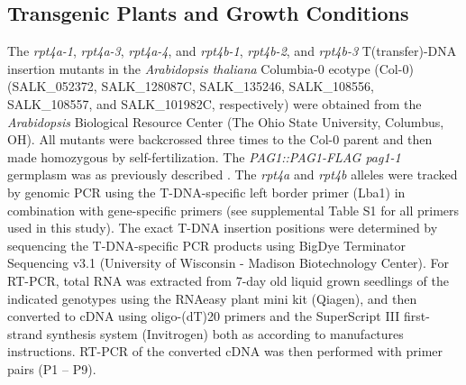 \subsection{Transgenic Plants and Growth Conditions}
The \textit{rpt4a-1},\textit{ rpt4a-3},\textit{ rpt4a-4}, and \textit{rpt4b-1}, \textit{rpt4b-2}, and \textit{rpt4b-3} T(transfer)-DNA insertion mutants in the \textit{Arabidopsis thaliana} Columbia-0 ecotype (Col-0) (SALK\_052372, SALK\_128087C, SALK\_135246, SALK\_108556, SALK\_108557, and SALK\_101982C, respectively) were obtained from the \textit{Arabidopsis} Biological Resource Center (The Ohio State University, Columbus, OH). All mutants were backcrossed three times to the Col-0 parent and then made homozygous by self-fertilization. The \textit{PAG1::PAG1-FLAG pag1-1} germplasm was as previously described \citep{book10}. The \textit{rpt4a} and \textit{rpt4b} alleles were tracked by genomic PCR using the T-DNA-specific left border primer (Lba1) in combination with gene-specific primers (see supplemental Table S1 for all primers used in this study). The exact T-DNA insertion positions were determined by sequencing the T-DNA-specific PCR products using BigDye Terminator Sequencing v3.1 (University of Wisconsin - Madison Biotechnology Center). For RT-PCR, total RNA was extracted from 7-day old liquid grown seedlings of the indicated genotypes using the RNAeasy plant mini kit (Qiagen), and then converted to cDNA using oligo-(dT)20 primers and the SuperScript III first-strand synthesis system (Invitrogen) both as according to manufactures instructions.  RT-PCR of the converted cDNA was then performed with primer pairs (P1 – P9). 

